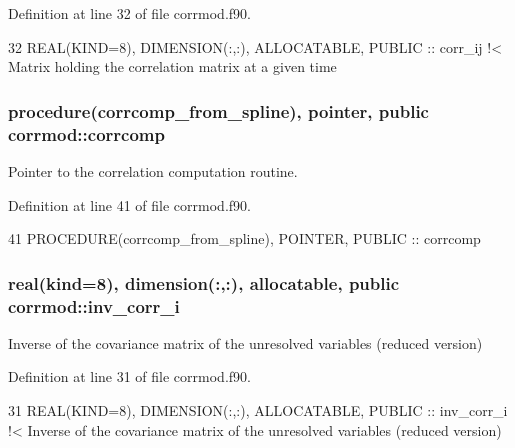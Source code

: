 Definition at line 32 of file corrmod.\+f90.


\begin{DoxyCode}
32   \textcolor{keywordtype}{REAL(KIND=8)}, \textcolor{keywordtype}{DIMENSION(:,:)}, \textcolor{keywordtype}{ALLOCATABLE}, \textcolor{keywordtype}{PUBLIC} :: corr\_ij\textcolor{comment}{ !< Matrix holding the correlation matrix at
       a given time}
\end{DoxyCode}
\subsubsection[{\texorpdfstring{corrcomp}{corrcomp}}]{\setlength{\rightskip}{0pt plus 5cm}procedure({\bf corrcomp\+\_\+from\+\_\+spline}), pointer, public corrmod\+::corrcomp}\hypertarget{namespacecorrmod_ad42bfc9c0ec2cf55958a45b46839d856}{}\label{namespacecorrmod_ad42bfc9c0ec2cf55958a45b46839d856}


Pointer to the correlation computation routine. 



Definition at line 41 of file corrmod.\+f90.


\begin{DoxyCode}
41   \textcolor{keywordtype}{PROCEDURE}(corrcomp\_from\_spline), \textcolor{keywordtype}{POINTER}, \textcolor{keywordtype}{PUBLIC} :: corrcomp
\end{DoxyCode}
\subsubsection[{\texorpdfstring{inv\+\_\+corr\+\_\+i}{inv_corr_i}}]{\setlength{\rightskip}{0pt plus 5cm}real(kind=8), dimension(\+:,\+:), allocatable, public corrmod\+::inv\+\_\+corr\+\_\+i}\hypertarget{namespacecorrmod_a5a938587078064124588605255e93a19}{}\label{namespacecorrmod_a5a938587078064124588605255e93a19}


Inverse of the covariance matrix of the unresolved variables (reduced version) 



Definition at line 31 of file corrmod.\+f90.


\begin{DoxyCode}
31   \textcolor{keywordtype}{REAL(KIND=8)}, \textcolor{keywordtype}{DIMENSION(:,:)}, \textcolor{keywordtype}{ALLOCATABLE}, \textcolor{keywordtype}{PUBLIC} :: inv\_corr\_i\textcolor{comment}{ !< Inverse of the covariance matrix of
       the unresolved variables (reduced version)}
\end{DoxyCode}

